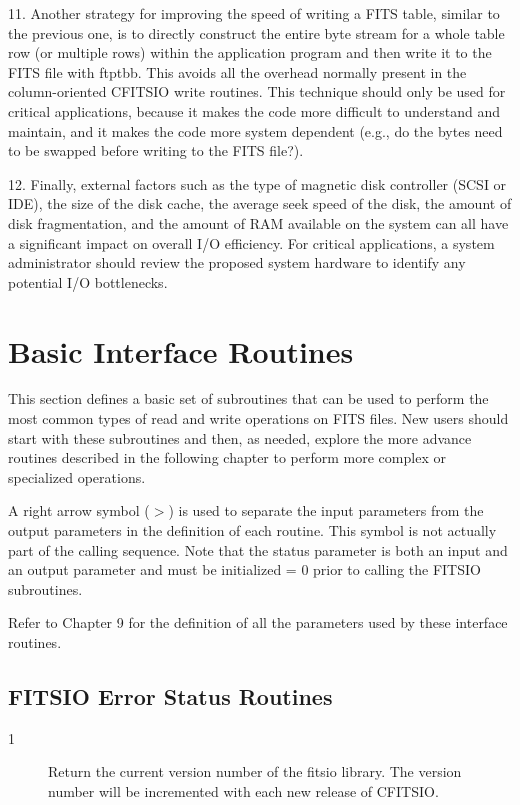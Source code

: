 \documentclass[11pt]{book}
\begin{document}
11. Another strategy for improving the speed of writing a FITS table,
similar to the previous one, is to directly construct the entire byte
stream for a whole table row (or multiple rows) within the application
program and then write it to the FITS file with
ftptbb.  This avoids all the overhead normally present
in the column-oriented CFITSIO write routines.  This technique should
only be used for critical applications, because it makes the code more
difficult to understand and maintain, and it makes the code more system
dependent (e.g., do the bytes need to be swapped before writing to the
FITS file?).

12.  Finally, external factors such as the type of magnetic disk
controller (SCSI or IDE), the size of the disk cache, the average seek
speed of the disk, the amount of disk fragmentation, and the amount of
RAM available on the system can all have a significant impact on
overall I/O efficiency.  For critical applications, a system
administrator should review the proposed system hardware to identify any
potential I/O bottlenecks.



\chapter{  Basic Interface Routines }

This section defines a basic set of subroutines that can be
used to perform the most common types of read and write operations
on FITS files.  New users should start with these subroutines and
then, as needed, explore the more advance routines described in
the following chapter to perform more complex or specialized operations.

A right arrow symbol ($>$) is used to separate the input parameters from
the output parameters in the  definition of each routine.  This symbol
is not actually part of the calling sequence.  Note that
the status parameter is both an input and an output parameter
and must be initialized = 0 prior to calling the FITSIO subroutines.

Refer to Chapter 9 for the definition of all the parameters
used by these interface routines.


\section{FITSIO Error Status Routines \label{FTVERS}}


\begin{description}
\item[1 ] Return the current version number of the fitsio library.
    The version number will be incremented with each new
   release of CFITSIO.
\end{description}
\end{document}
